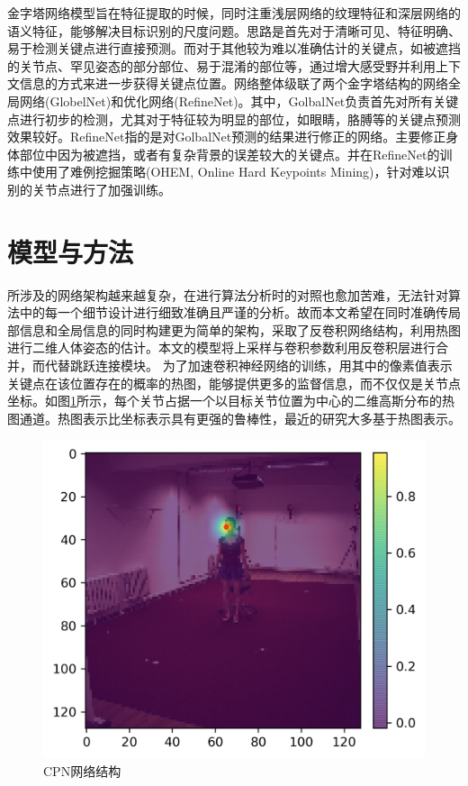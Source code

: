 金字塔网络模型旨在特征提取的时候，同时注重浅层网络的纹理特征和深层网络的语义特征，能够解决目标识别的尺度问题。思路是首先对于清晰可见、特征明确、易于检测关键点进行直接预测。而对于其他较为难以准确估计的关键点，如被遮挡的关节点、罕见姿态的部分部位、易于混淆的部位等，通过增大感受野并利用上下文信息的方式来进一步获得关键点位置。网络整体级联了两个金字塔结构的网络全局网络(GlobelNet)和优化网络(RefineNet)。其中，GolbalNet负责首先对所有关键点进行初步的检测，尤其对于特征较为明显的部位，如眼睛，胳膊等的关键点预测效果较好。RefineNet指的是对GolbalNet预测的结果进行修正的网络。主要修正身体部位中因为被遮挡，或者有复杂背景的误差较大的关键点。并在RefineNet的训练中使用了难例挖掘策略(OHEM, Online Hard Keypoints Mining)，针对难以识别的关节点进行了加强训练。


\section{模型与方法}
所涉及的网络架构越来越复杂，在进行算法分析时的对照也愈加苦难，无法针对算法中的每一个细节设计进行细致准确且严谨的分析。故而本文希望在同时准确传局部信息和全局信息的同时构建更为简单的架构，采取了反卷积网络结构，利用热图进行二维人体姿态的估计。本文的模型将上采样与卷积参数利用反卷积层进行合并，而代替跳跃连接模块。
为了加速卷积神经网络的训练，用其中的像素值表示关键点在该位置存在的概率的热图，能够提供更多的监督信息，而不仅仅是关节点坐标。如图\ref{fig:f18}所示，每个关节占据一个以目标关节位置为中心的二维高斯分布的热图通道。热图表示比坐标表示具有更强的鲁棒性，最近的研究大多基于热图表示。
\begin{figure}[h]
	\centering
	\includegraphics[scale=0.4]{figures/18.png}
	\caption{CPN网络结构}
	\label{fig:f18}
\end{figure}
